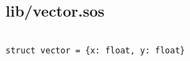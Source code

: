 \documentclass[main.tex]{subfiles}
\begin{document}
\subsection{lib/vector.sos}

\begin{lstlisting}

struct vector = {x: float, y: float}

\end{lstlisting}
\end{document}
